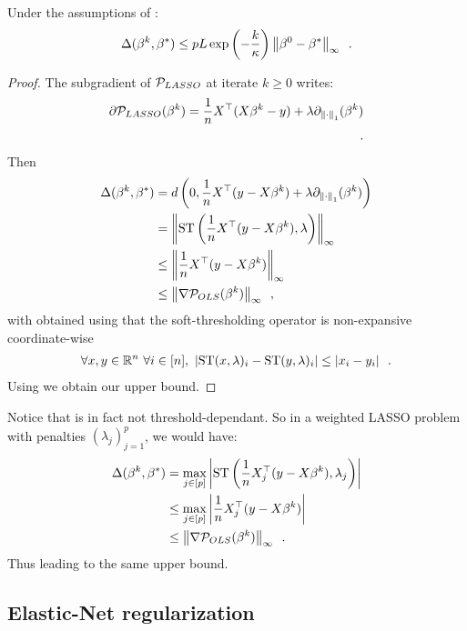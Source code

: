 \documentclass[../main.tex]{subfiles}
\begin{document}
\begin{proposition}\label{prop:lasso_kkt}
Under the assumptions of :
\begin{align}
    \Delta(\beta^k, \beta^*)
    \leq pL \exp\left(-\frac{k}{\kappa}\right) \left \lVert \beta^0 - \beta^* \right \rVert_\infty
    \enspace.
\end{align}
\end{proposition}
\begin{proof}
The subgradient of $\mathcal{P}_{LASSO}$ at iterate $k\geq 0$ writes:
\begin{align*}
\partial \mathcal{P}_{LASSO} (\beta^k)
= \frac{1}{n}X^\top (X\beta^k - y)
+ \lambda \partial_{\left \lVert \cdot \right \rVert_1}(\beta^k) \\
\enspace.
\end{align*}
Then
\begin{align}
\Delta(\beta^k, \beta^*)
& = d\left( 0, \frac{1}{n}X^\top (y-X\beta^k)
+ \lambda \partial_{\left \lVert \cdot \right \rVert_1}(\beta^k)  \right)\nonumber \\
& = \left \lVert \operatorname{ST}\left(\frac{1}{n}X^\top (y-X\beta^k), \lambda\right) \right \rVert_\infty \nonumber \\
& \leq \left \lVert \frac{1}{n}X^\top (y-X\beta^k) \right \rVert_\infty \label{ineq:st_non_expansive}\\
& \leq \left \lVert \nabla \mathcal{P}_{OLS}(\beta^k) \right \rVert_\infty
\enspace,\nonumber
\end{align}
with  obtained using that the soft-thresholding operator
is non-expansive coordinate-wise \citep[Lemma 3.2]{hale2008fixed} \ie
\begin{align*}
\forall x,y\in\mathbb{R}^n\ \forall i\in [n],\ \left \vert \operatorname{ST}(x, \lambda)_i - \operatorname{ST}(y, \lambda)_i \right \vert
\leq \left \vert x_i - y_i \right \vert\enspace.
\end{align*}
Using  we obtain our upper bound.
\end{proof}

Notice that  is in fact not threshold-dependant.
So in a weighted LASSO problem with penalties $(\lambda_j)_{j=1}^p$, we would have:
\begin{align*}
\Delta(\beta^k, \beta^*)
& = \max_{j\in[p]}\left \vert \operatorname{ST}\left(\frac{1}{n}X^\top_j (y-X\beta^k), \lambda_j\right) \right \vert \\
& \leq \max_{j\in[p]}\left \vert \frac{1}{n}X^\top_j (y-X\beta^k) \right \vert \\
& \leq \left \lVert \nabla \mathcal{P}_{OLS}(\beta^k) \right \rVert_\infty
\enspace.
\end{align*}
Thus leading to the same upper bound.

\subsection{Elastic-Net regularization}
\end{document}
